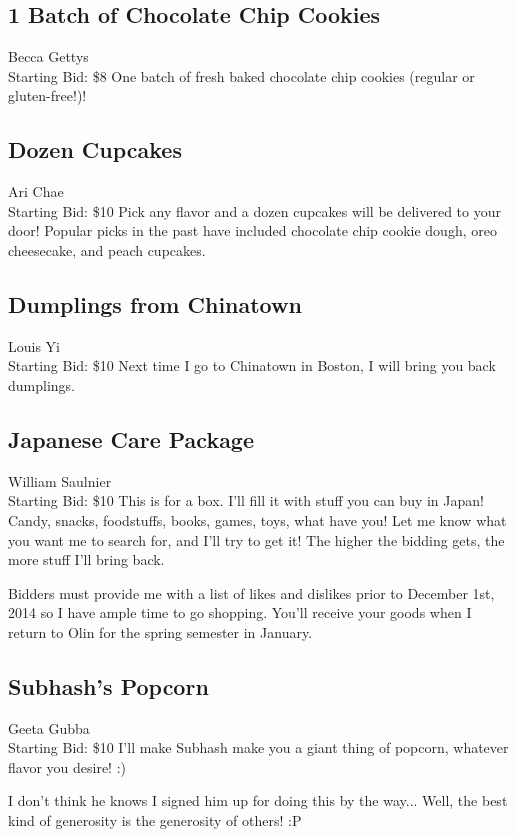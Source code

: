 \documentclass[11pt]{article}
\begin{document}
\subsection{1 Batch of Chocolate Chip  Cookies}
Becca Gettys
\\
Starting Bid: \$8
\newline
One batch of fresh baked chocolate chip cookies (regular or gluten-free!)!
\subsection{Dozen Cupcakes}
Ari Chae
\\
Starting Bid: \$10
\newline
Pick any flavor and a dozen cupcakes will be delivered to your door! Popular picks in the past have included chocolate chip cookie dough, oreo cheesecake, and peach cupcakes.
\subsection{Dumplings from Chinatown}
Louis Yi
\\
Starting Bid: \$10
\newline
Next time I go to Chinatown in Boston, I will bring you back dumplings.
\subsection{Japanese Care Package}
William Saulnier
\\
Starting Bid: \$10
\newline
This is for a box. I'll fill it with stuff you can buy in Japan! Candy, snacks, foodstuffs, books, games, toys, what have you! Let me know what you want me to search for, and I'll try to get it! The higher the bidding gets, the more stuff I'll bring back.

Bidders must provide me with a list of likes and dislikes prior to December 1st, 2014 so I have ample time to go shopping. You'll receive your goods when I return to Olin for the spring semester in January.
\subsection{Subhash's Popcorn}
Geeta Gubba
\\
Starting Bid: \$10
\newline
I'll make Subhash make you a giant thing of popcorn, whatever flavor you desire! :)

I don't think he knows I signed him up for doing this by the way... Well, the best kind of generosity is the generosity of others! :P
\end{document}
